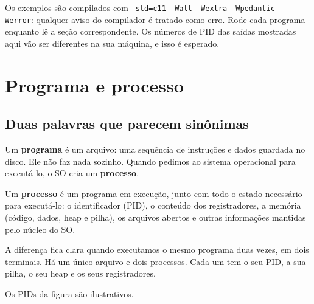 \documentclass[11pt,a4paper]{article}
\newcommand{\cmd}[1]{\texttt{#1}}
\begin{document}
Os exemplos são compilados com \cmd{-std=c11 -Wall -Wextra -Wpedantic -Werror}: qualquer aviso do compilador é tratado como erro. Rode cada programa enquanto lê a seção correspondente. Os números de PID das saídas mostradas aqui vão ser diferentes na sua máquina, e isso é esperado.

\section{Programa e processo}

\subsection{Duas palavras que parecem sinônimas}

Um \textbf{programa} é um arquivo: uma sequência de instruções e dados guardada no disco. Ele não faz nada sozinho. Quando pedimos ao sistema operacional para executá-lo, o SO cria um \textbf{processo}.

\begin{definicao}
Um \textbf{processo} é um programa em execução, junto com todo o estado necessário para executá-lo: o identificador (PID), o conteúdo dos registradores, a memória (código, dados, heap e pilha), os arquivos abertos e outras informações mantidas pelo núcleo do SO.
\end{definicao}

A diferença fica clara quando executamos o mesmo programa duas vezes, em dois terminais. Há um único arquivo e dois processos. Cada um tem o seu PID, a sua pilha, o seu heap e os seus registradores.

\begin{center}

{\small Os PIDs da figura são ilustrativos.}
\end{center}
\end{document}
